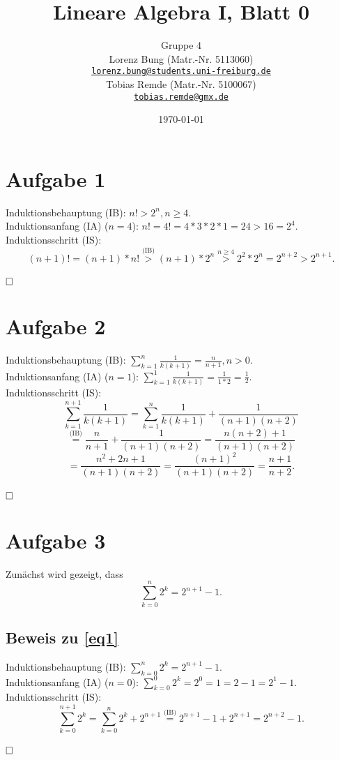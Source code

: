 \documentclass[12pt,a4paper]{article}
\title{Lineare Algebra I, Blatt 0}
\author{Gruppe 4\\
    Lorenz Bung (Matr.-Nr. 5113060)\\
    \href{mailto:lorenz.bung@students.uni-freiburg.de}{\texttt{lorenz.bung@students.uni-freiburg.de}}\\
    Tobias Remde (Matr.-Nr. 5100067)\\
    \href{mailto:tobias.remde@gmx.de}{\texttt{tobias.remde@gmx.de}}
}
\date{\today}
\newcommand{\qed}{\null\nobreak\hfill\square}
\begin{document}
\maketitle


\section*{Aufgabe 1}

Induktionsbehauptung (IB): $n! > 2^n, n \geq 4.$\\
Induktionsanfang (IA) ($n = 4$): $n! = 4! = 4 * 3 * 2 * 1 = 24 > 16 = 2^4.$\\
Induktionsschritt (IS): $$(n + 1)! = (n + 1) * n! \overset{\text{(IB)}}{>} (n + 1) * 2^n \overset{n \geq 4}{>} 2^2 * 2^n = 2^{n + 2} > 2^{n + 1}.$$\\
$\qed$


\section*{Aufgabe 2}

Induktionsbehauptung (IB): $\sum\limits_{k = 1}^n \frac{1}{k (k + 1)} = \frac{n}{n + 1}, n > 0.$\\
Induktionsanfang (IA) ($n = 1$): $\sum\limits_{k = 1}^1 \frac{1}{k (k + 1)} = \frac{1}{1 * 2} = \frac{1}{2}.$\\
Induktionsschritt (IS):
$$\sum\limits_{k = 1}^{n + 1} \frac{1}{k (k + 1)} = \sum\limits_{k = 1}^n \frac{1}{k (k + 1)} + \frac{1}{(n + 1) (n + 2)}$$
$$\overset{\text{(IB)}}{=} \frac{n}{n + 1} + \frac{1}{(n + 1)(n + 2)} = \frac{n(n + 2) + 1}{(n + 1)(n + 2)}$$
$$= \frac{n^2 + 2n + 1}{(n + 1)(n + 2)} = \frac{(n + 1)^2}{(n + 1)(n + 2)} = \frac{n + 1}{n + 2}.$$\\
$\qed$


\section*{Aufgabe 3}
\label{sec:a3}

Zunächst wird gezeigt, dass
\begin{equation}
\label{eq1}
\sum\limits_{k = 0}^n 2^k = 2^{n + 1} - 1.
\end{equation}

\subsection*{Beweis zu \ref{eq1}}
Induktionsbehauptung (IB): $\sum\limits_{k = 0}^n 2^k = 2^{n + 1} - 1.$\\
Induktionsanfang (IA) ($n = 0$): $\sum\limits_{k = 0}^0 2^k = 2^0 = 1 = 2 - 1 = 2^1 - 1$.\\
Induktionsschritt (IS): $$\sum\limits_{k = 0}^{n + 1} 2^k = \sum\limits_{k = 0}^n 2^k + 2^{n + 1} \overset{\text{(IB)}}{=} 2^{n + 1} - 1 + 2^{n + 1} = 2^{n + 2} - 1.$$\\
$\qed$
\end{document}
